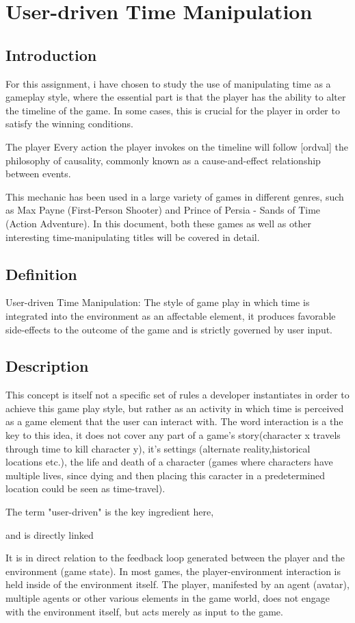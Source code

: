 \chapter{User-driven Time Manipulation}

\section{Introduction}

For this assignment, i have chosen to study the use of manipulating time as a gameplay style, where the essential part is that the player has the ability to alter the timeline of the game. In some cases, this is crucial for the player in order to satisfy the winning conditions. 

The player 
Every action the player invokes on the timeline will follow [ordval] the philosophy of causality, commonly known as a cause-and-effect relationship between events. 

This mechanic has been used in a large variety of games in different genres, such as Max Payne (First-Person Shooter) and Prince of Persia - Sands of Time (Action Adventure). In this document, both these games as well as other interesting time-manipulating titles will be covered in detail. 

\section{Definition}
User-driven Time Manipulation: The style of game play in which time is integrated into the environment as an affectable element, it produces favorable side-effects to the outcome of the game and is strictly governed by user input. 

\section{Description}

This concept is itself not a specific set of rules a developer instantiates in order to achieve this game play style, 
but rather as an activity in which time is perceived as a game element that the user can interact with. 
The word interaction is a the key to this idea, it does not cover any part of a game's story(character x travels 
through time to kill character y),  it's settings (alternate reality,historical locations etc.), the life and death of a 
character (games where characters have multiple lives, since dying and then placing this caracter in a predetermined 
location could be seen as time-travel). 

The term "user-driven" is the key ingredient here,

 and is directly linked 

It is in direct relation to the feedback loop generated 
between the player and the environment (game state).
 In most games, the player-environment interaction is held inside of the environment itself. The player, manifested by an agent (avatar), multiple agents or other various elements in the game world, does not engage with the environment itself, but acts merely as input to the game. 
